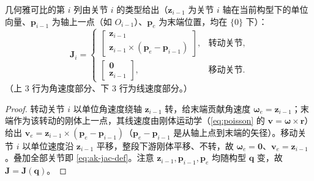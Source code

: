 \begin{theorem}[几何雅可比的逐列构造]\label{thm:ak-jac-columns}
几何雅可比的第 $i$ 列由关节 $i$ 的类型给出\cite{lynch2017modern,spong2006robot}（$\mathbf{z}_{i-1}$ 为关节 $i$ 轴在当前构型下的单位向量、$\mathbf{p}_{i-1}$ 为轴上一点（如 $O_{i-1}$）、$\mathbf{p}_e$ 为末端位置，均在 $\{0\}$ 下）：
\begin{equation}
  \boxed{\mathbf{J}_i=
  \begin{cases}
    \begin{bmatrix}\mathbf{z}_{i-1}\\[2pt]\mathbf{z}_{i-1}\times(\mathbf{p}_e-\mathbf{p}_{i-1})\end{bmatrix}, & \text{转动关节},\\[14pt]
    \begin{bmatrix}\mathbf{0}\\[2pt]\mathbf{z}_{i-1}\end{bmatrix}, & \text{移动关节}.
  \end{cases}}
  \label{eq:ak-jac-columns}
\end{equation}
（上 3 行为角速度部分、下 3 行为线速度部分。）
\end{theorem}
\begin{proof}
转动关节 $i$ 以单位角速度绕轴 $\mathbf{z}_{i-1}$ 转，给末端贡献角速度 $\boldsymbol{\omega}_e=\mathbf{z}_{i-1}$；末端作为该转动的刚体上一点，其线速度由刚体运动学（\cref{eq:poisson} 的 $\mathbf{v}=\boldsymbol{\omega}\times\mathbf{r}$）给出 $\mathbf{v}_e=\mathbf{z}_{i-1}\times(\mathbf{p}_e-\mathbf{p}_{i-1})$（$\mathbf{p}_e-\mathbf{p}_{i-1}$ 是从轴上点到末端的矢径）。移动关节 $i$ 以单位速度沿 $\mathbf{z}_{i-1}$ 平移，整段下游刚体平移、不转，故 $\boldsymbol{\omega}_e=\mathbf{0}$、$\mathbf{v}_e=\mathbf{z}_{i-1}$。叠加全部关节即 \cref{eq:ak-jac-def}。注意 $\mathbf{z}_{i-1},\mathbf{p}_{i-1},\mathbf{p}_e$ 均随构型 $\mathbf{q}$ 变，故 $\mathbf{J}=\mathbf{J}(\mathbf{q})$。
\end{proof}

